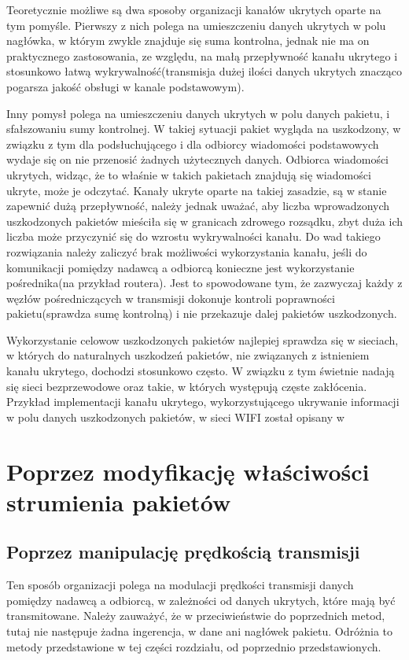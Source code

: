 \documentclass[a4paper, twoside]{report}
\begin{document}
        Teoretycznie możliwe są dwa
        sposoby organizacji kanałów ukrytych oparte na tym pomyśle. Pierwszy z nich polega na umieszczeniu
        danych ukrytych w polu nagłówka, w którym zwykle znajduje się suma kontrolna,
        jednak nie ma on praktycznego zastosowania, ze względu, na małą przepływność
        kanału ukrytego i stosunkowo łatwą wykrywalność(transmisja dużej ilości
        danych ukrytych znacząco pogarsza jakość obsługi w kanale podstawowym).

        Inny pomysł polega
        na umieszczeniu danych ukrytych w polu danych pakietu, i sfałszowaniu sumy
        kontrolnej. W takiej sytuacji pakiet wygląda na uszkodzony, w związku z tym
        dla podsłuchującego i dla odbiorcy wiadomości podstawowych wydaje się
        on nie przenosić żadnych użytecznych danych. Odbiorca wiadomości ukrytych,
        widząc, że to właśnie w takich pakietach znajdują się wiadomości ukryte,
        może je odczytać. Kanały ukryte oparte na takiej zasadzie, są w stanie
        zapewnić dużą przepływność, należy jednak uważać, aby liczba wprowadzonych
        uszkodzonych pakietów mieściła się w granicach zdrowego rozsądku, zbyt duża
        ich liczba może przyczynić się do wzrostu wykrywalności kanału. Do wad takiego
        rozwiązania należy zaliczyć brak możliwości wykorzystania kanału, jeśli do
        komunikacji pomiędzy nadawcą a odbiorcą konieczne jest wykorzystanie pośrednika(na przykład routera).
        Jest to spowodowane tym, że zazwyczaj każdy z węzłów pośredniczących w transmisji
        dokonuje kontroli poprawności pakietu(sprawdza sumę kontrolną) i nie przekazuje
        dalej pakietów uszkodzonych.

        Wykorzystanie celowow uszkodzonych pakietów najlepiej sprawdza się w
        sieciach, w których do naturalnych uszkodzeń pakietów, nie związanych z
        istnieniem kanału ukrytego, dochodzi stosunkowo często. W związku z tym
        świetnie nadają się sieci bezprzewodowe oraz takie, w których występują
        częste zakłócenia. Przykład implementacji kanału ukrytego, wykorzystującego
        ukrywanie informacji w polu danych uszkodzonych pakietów, w sieci WIFI
        został opisany w \cite{HICCUPS}

    \section{Poprzez modyfikację właściwości strumienia pakietów}
        \subsection{Poprzez manipulację prędkością transmisji}
        Ten sposób organizacji polega na modulacji prędkości transmisji danych
        pomiędzy nadawcą a odbiorcą, w zależności od danych ukrytych, które mają
        być transmitowane. Należy zauważyć, że w przeciwieństwie do poprzednich
        metod, tutaj nie następuje żadna ingerencja, w dane ani nagłówek pakietu.
        Odróżnia to metody przedstawione w tej części rozdziału, od poprzednio
        przedstawionych.
\end{document}
